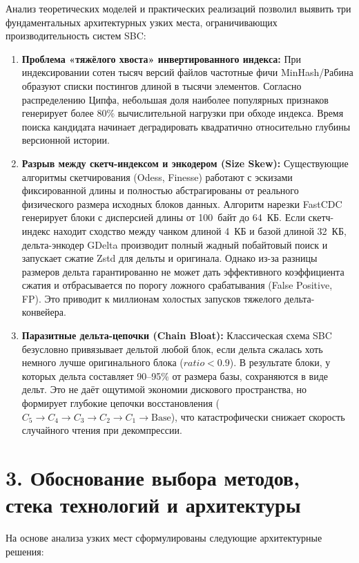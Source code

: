 \documentclass[a4paper,14pt]{extarticle}
\begin{document}
Анализ теоретических моделей и практических реализаций позволил выявить три фундаментальных архитектурных узких места, ограничивающих производительность систем SBC:

\begin{enumerate}
    \item \textbf{Проблема «тяжёлого хвоста» инвертированного индекса:}
    При индексировании сотен тысяч версий файлов частотные фичи MinHash/Рабина образуют списки постингов длиной в тысячи элементов. Согласно распределению Ципфа, небольшая доля наиболее популярных признаков генерирует более 80\% вычислительной нагрузки при обходе индекса. Время поиска кандидата начинает деградировать квадратично относительно глубины версионной истории.

    \item \textbf{Разрыв между скетч-индексом и энкодером (Size Skew):}
    Существующие алгоритмы скетчирования (Odess, Finesse) работают с эскизами фиксированной длины и полностью абстрагированы от реального физического размера исходных блоков данных. Алгоритм нарезки FastCDC генерирует блоки с дисперсией длины от 100~байт до 64~КБ. Если скетч-индекс находит сходство между чанком длиной 4~КБ и базой длиной 32~КБ, дельта-энкодер GDelta производит полный жадный побайтовый поиск и запускает сжатие Zstd для дельты и оригинала. Однако из-за разницы размеров дельта гарантированно не может дать эффективного коэффициента сжатия и отбрасывается по порогу ложного срабатывания (False Positive, FP). Это приводит к миллионам холостых запусков тяжелого дельта-конвейера.

    \item \textbf{Паразитные дельта-цепочки (Chain Bloat):}
    Классическая схема SBC безусловно привязывает дельтой любой блок, если дельта сжалась хоть немного лучше оригинального блока ($ratio < 0.9$). В результате блоки, у которых дельта составляет 90--95\% от размера базы, сохраняются в виде дельт. Это не даёт ощутимой экономии дискового пространства, но формирует глубокие цепочки восстановления ($C_5 \to C_4 \to C_3 \to C_2 \to C_1 \to \text{Base}$), что катастрофически снижает скорость случайного чтения при декомпрессии.
\end{enumerate}

\section*{3. Обоснование выбора методов, стека технологий и архитектуры}

На основе анализа узких мест сформулированы следующие архитектурные решения:
\end{document}
